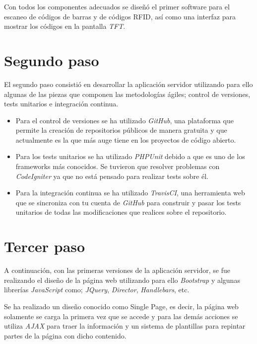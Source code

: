 Con todos los componentes adecuados se diseñó el primer software para el escaneo de códigos de barras y de códigos RFID, así como una interfaz para mostrar los códigos en la pantalla \emph{TFT}.

\section{Segundo paso}

El segundo paso consistió en desarrollar la aplicación servidor utilizando para ello algunas de las piezas que componen las metodologías ágiles; control de versiones, tests unitarios e integración continua.

\begin{itemize}

    \item Para el control de versiones se ha utilizado \emph{GitHub}, una plataforma que permite la creación de repositorios públicos de manera gratuita y que actualmente es la que más auge tiene en los proyectos de código abierto.

    \item Para los tests unitarios se ha utilizado \emph{PHPUnit} debido a que es uno de los frameworks más conocidos. Se tuvieron que resolver problemas con \emph{CodeIgniter} ya que no está pensado para realizar tests sobre él.

    \item Para la integración continua se ha utilizado \emph{TravisCI}, una herramienta web que se sincroniza con tu cuenta de \emph{GitHub} para construir y pasar los tests unitarios de todas las modificaciones que realices sobre el repositorio.

\end{itemize}

\section{Tercer paso}

A continuación, con las primeras versiones de la aplicación servidor, se fue realizando el diseño de la página web utilizando para ello \emph{Bootstrap} y algunas librerías \emph{JavaScript} como; \emph{JQuery}, \emph{Director}, \emph{Handlebars}, etc.

Se ha realizado un diseño conocido como Single Page, es decir, la página web solamente se carga la primera vez que se accede y para las demás acciones se utiliza \emph{AJAX} para traer la información y un sistema de plantillas para repintar partes de la página con dicho contenido.

